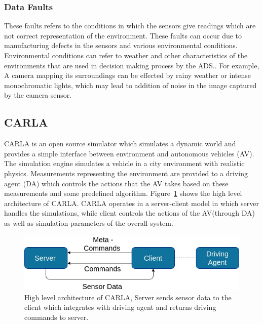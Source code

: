  \subsubsection{Data Faults} These faults refers to the conditions in which the sensors give readings which are not correct representation of the environment. These faults can occur due to manufacturing defects in the sensors and various environmental conditions. Environmental conditions can refer to weather and other characteristics of the environments that are used in decision making process by the ADS.. For example, A camera mapping its surroundings can be effected by rainy weather or intense monochromatic lights, which may lead to addition of noise in the image captured by the camera sensor.
 
 \subsection{CARLA} \label{ri-carla}
 CARLA is an open source simulator which simulates a dynamic world and provides a simple interface between environment and autonomous vehicles (AV). The simulation engine simulates a vehicle in a city environment with realistic physics. Measurements representing the environment are provided to a driving agent (DA) which  controls the actions that the AV takes based on these measurements and some predefined algorithm. Figure~\ref{fig:carla_arch} shows the high level architecture of CARLA. CARLA operates in a server-client model in which server handles the simulations, while client controls the actions of the AV(through DA) as well as simulation parameters of the overall system. 
 
 
 \begin{figure}  [h]
 	\vspace{-0.5em}
 	\centering
 	\includegraphics[scale=0.4]{CARLA_block}
 	\vspace{-0.5em}
 	\caption{High level architecture of CARLA, Server sends sensor data to the client which integrates with driving agent and returns driving commands to server.}
 	\label{fig:carla_arch}
 	\vspace{-1.5em}
 \end{figure}
 
